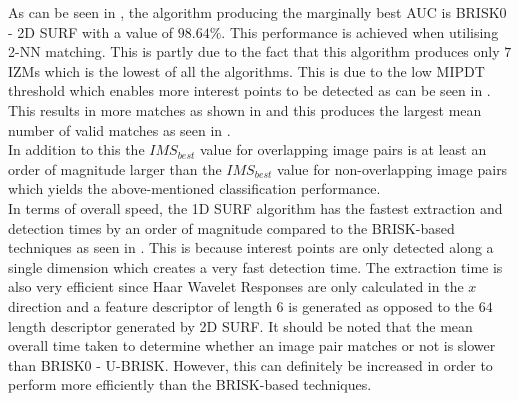 \documentclass[11pt]{report}
\begin{document}
As can be seen in , the algorithm producing the marginally best AUC is BRISK0 - 2D SURF with a value of $98.64\%$. This performance is achieved when utilising 2-NN matching. This is partly due to the fact that this algorithm produces only $7$ IZMs which is the lowest of all the algorithms. This is due to the low MIPDT threshold which enables more interest points to be detected as can be seen in . This results in more matches as shown in  and this produces the largest mean number of valid matches as seen in .\\

In addition to this the $IMS_{best}$ value for overlapping image pairs is at least an order of magnitude larger than the $IMS_{best}$ value for non-overlapping image pairs which yields the above-mentioned classification performance. \\




In terms of overall speed, the 1D SURF algorithm has the fastest extraction and detection times by an order of magnitude compared to the BRISK-based techniques as seen in . This is because interest points are only detected along a single dimension which creates a very fast detection time. The extraction time is also very efficient since Haar Wavelet Responses are only calculated in the $x$ direction and a feature descriptor of length $6$ is generated as opposed to the $64$ length descriptor generated by 2D SURF. It should be noted that the mean overall time taken to determine whether an image pair matches or not is slower than BRISK0 - U-BRISK. However, this can definitely be increased in order to perform more efficiently than the BRISK-based techniques.\\
\end{document}
